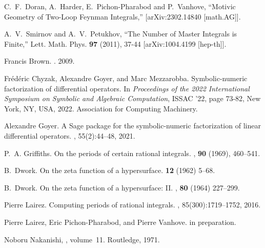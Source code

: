 \documentclass[a4paper,12pt]{article}
\numberwithin{equation}{section}
\numberwithin{figure}{section}
\begin{document}
\begin{thebibliography}{99}
C.~F.~Doran, A.~Harder, E.~Pichon-Pharabod and P.~Vanhove,
``Motivic Geometry of Two-Loop Feynman Integrals,''
[arXiv:2302.14840 [math.AG]].

A.~V.~Smirnov and A.~V.~Petukhov,
``The Number of Master Integrals is Finite,''
Lett. Math. Phys. \textbf{97} (2011), 37-44
[arXiv:1004.4199 [hep-th]].



Francis Brown.
.
 2009.
\newblock [arXiv:0910.0114]  

Fr\'{e}d\'{e}ric Chyzak, Alexandre Goyer, and Marc Mezzarobba.
\newblock Symbolic-numeric factorization of differential operators.
\newblock In {\em Proceedings of the 2022 International Symposium on Symbolic
  and Algebraic Computation}, ISSAC '22, page 73-82, New York, NY, USA, 2022.
Association for Computing Machinery.
\newblock [arXiv:2205.08991]

Alexandre Goyer.
\newblock A {S}age package for the symbolic-numeric factorization of linear
  differential operators.
, 55(2):44--48,
2021.


P.~A. Griffiths.
\newblock On the periods of certain rational integrals.
, {\bf 90} (1969), 460--541.

B.~Dwork.
\newblock On the zeta function of a hypersurface.
 {\bf 12} (1962) 5--68.

B.~Dwork.
\newblock On the zeta function of a hypersurface: {{II}}.
, {\bf 80} (1964) 227--299.

Pierre Lairez.
\newblock Computing periods of rational integrals.
, 85(300):1719--1752, 2016.
\newblock [arXiv:1404.5069]

Pierre Lairez, Eric Pichon-Pharabod, and Pierre Vanhove.
\newblock in preparation.



Noboru Nakanishi,
, volume~11.
\newblock Routledge, 1971.



\end{thebibliography}
\end{document}
